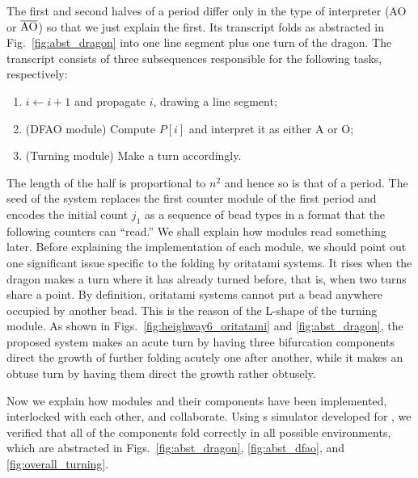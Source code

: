 The first and second halves of a period differ only in the type of interpreter (AO or $\overline{\rm AO}$) so that we just explain the first. 
Its transcript folds as abstracted in Fig.~\ref{fig:abst_dragon} into one line segment plus one turn of the dragon. 
The transcript consists of three subsequences responsible for the following tasks, respectively:  
\begin{enumerate}[itemsep=0pt]
\item $i \gets i + 1$ and propagate $i$, drawing a line segment;
\item (DFAO module) Compute $P[i]$ and interpret it as either A or O;
\item (Turning module) Make a turn accordingly.
\end{enumerate}
The length of the half is proportional to $n^2$ and hence so is that of a period. 
The seed of the system replaces the first counter module of the first period and encodes the initial count $j_1$ as a sequence of bead types in a format that the following counters can ``read.'' 
We shall explain how modules read something later. 
Before explaining the implementation of each module, we should point out one significant issue specific to the folding by oritatami systems. 
It rises when the dragon makes a turn where it has already turned before, that is, when two turns share a point. 
By definition, oritatami systems cannot put a bead anywhere occupied by another bead. 
This is the reason of the L-shape of the turning module. 
As shown in Figs.~\ref{fig:heighway6_oritatami} and \ref{fig:abst_dragon}, the proposed system makes an acute turn by having three bifurcation components direct the growth of further folding acutely one after another, while it makes an obtuse turn by having them direct the growth rather obtusely. 


Now we explain how modules and their components have been implemented, interlocked with each other, and collaborate. 
Using s simulator developed for \cite{HaKiOtSe2016}, we verified that all of the components fold correctly in all possible environments, which are abstracted in Figs.~\ref{fig:abst_dragon}, \ref{fig:abst_dfao}, and \ref{fig:overall_turning}. 

